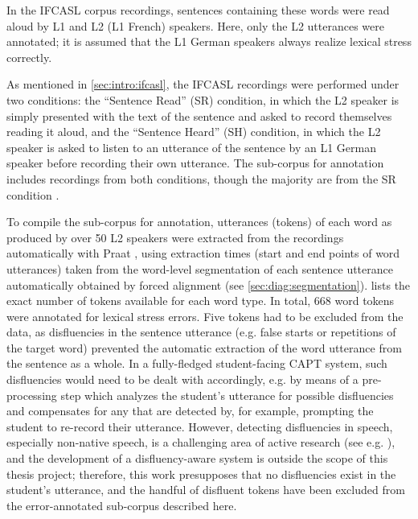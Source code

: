 	In the IFCASL corpus recordings, sentences containing these words were read aloud by L1 and L2 (L1 French) speakers. Here, only the L2 utterances were annotated; it is assumed that the L1 German speakers always realize lexical stress correctly. 
	
	As mentioned in \cref{sec:intro:ifcasl}, the IFCASL recordings were performed under two conditions: the ``Sentence Read'' (SR) condition, in which the L2 speaker is simply  presented with the text of the sentence and asked to record themselves reading it aloud, and the ``Sentence Heard'' (SH) condition, in which the L2 speaker is asked to listen to an utterance of the sentence by an L1 German speaker before recording their own utterance. The sub-corpus for annotation includes recordings from both conditions, though the majority are from the SR condition .
	
	To compile the sub-corpus for annotation, utterances (tokens) of each word as produced by over 50 L2 speakers were extracted from the recordings automatically with Praat \parencite{Boersma2014}, using extraction times (start and end points of word utterances) taken from the word-level segmentation of each sentence utterance automatically obtained by forced alignment (see \cref{sec:diag:segmentation}).
	 lists the exact number of tokens available for each word type. In total, 
	668 word tokens were annotated for lexical stress errors. 
	Five tokens had to be excluded from the data, as disfluencies in the sentence utterance (e.g. false starts or repetitions of the target word) prevented the automatic extraction of the word utterance from the sentence as a whole. In a fully-fledged student-facing CAPT system, such disfluencies would need to be dealt with accordingly, e.g. by means of a pre-processing step which analyzes the student's utterance for possible disfluencies and compensates for any that are detected by, for example, prompting the student to re-record their utterance. However, detecting disfluencies in speech, especially non-native speech, is a challenging area of active research (see e.g. \cite{Bonneau2012,Orosanu2012}), and the development of a  disfluency-aware system is outside the scope of this thesis project; therefore, this work presupposes that no disfluencies exist in the student's utterance, and the handful of disfluent tokens have been excluded from the error-annotated sub-corpus described here.
	
